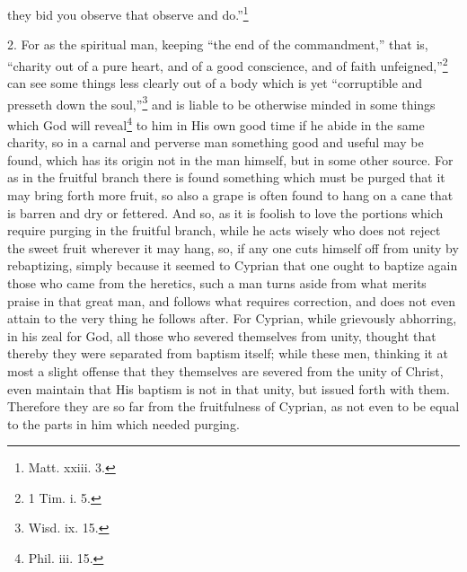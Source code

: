 they bid you observe that observe and do.''\footnote{\par  Matt. xxiii. 3.}

2. For as the spiritual man, keeping ``the end of the commandment,'' that is, ``charity out of a pure heart, and of a good conscience, and of faith unfeigned,''\footnote{\par  1 Tim. i. 5.} can see some things less clearly out of a body which is yet ``corruptible and presseth down the soul,''\footnote{\par  Wisd. ix. 15.} and is liable to be otherwise minded in some things which God will reveal\footnote{\par  Phil. iii. 15.} to him in His own good time if he abide in the same charity, so in a carnal and perverse man something good and useful may be found, which has its origin not in the man himself, but in some other source. For as in the fruitful branch there is found something which must be purged that it may bring forth more fruit, so also a grape is often found to hang on a cane that is barren and dry or fettered. And so, as it is foolish to love the portions which require purging in the fruitful branch, while he acts wisely who does not reject the sweet fruit wherever it may hang, so, if any one cuts himself off from unity by rebaptizing, simply because it seemed to Cyprian that one ought to baptize again those who came from the heretics, such a man turns aside from what merits praise in that great man, and follows what requires correction, and does not even attain to the very thing he follows after. For Cyprian, while grievously abhorring, in his zeal for God, all those who severed themselves from unity, thought that thereby they were separated from baptism itself; while these men, thinking it at most a slight offense that they themselves are severed from the unity of Christ, even maintain that His baptism is not in that unity, but issued forth with them. Therefore they are so far from the fruitfulness of Cyprian, as not even to be equal to the parts in him which needed purging.


